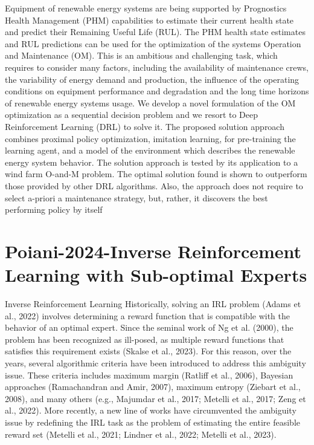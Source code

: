 \documentclass{article}
\begin{document}
Equipment of renewable energy systems are being supported by Prognostics  Health Management (PHM) capabilities to estimate their current health state and predict their Remaining Useful Life (RUL). The PHM health state estimates and RUL predictions can be used for the optimization of the systems Operation and Maintenance (OM). This is an ambitious and challenging task, which requires to consider many factors, including the availability of maintenance crews, the variability of energy demand and production, the influence of the operating conditions on equipment performance and degradation and the long time horizons of renewable energy systems usage. We develop a novel formulation of the OM optimization as a sequential decision problem and we resort to Deep Reinforcement Learning (DRL) to solve it. The proposed solution approach combines proximal policy optimization, imitation learning, for pre-training the learning agent, and a model of the environment which describes the renewable energy system behavior. The solution approach is tested by its application to a wind farm O-and-M problem. The optimal solution found is shown to outperform those provided by other DRL algorithms. Also, the approach does not require to select a-priori a maintenance strategy, but, rather, it discovers the best performing policy by itself



\section{Poiani-2024-Inverse Reinforcement Learning with Sub-optimal Experts}

Inverse Reinforcement Learning Historically,
solving an IRL problem (Adams et al., 2022) involves
determining a reward function that is compatible with
the behavior of an optimal expert. Since the seminal
work of Ng et al. (2000), the problem has been recognized
as ill-posed, as multiple reward functions that
satisfies this requirement exists (Skalse et al., 2023).
For this reason, over the years, several algorithmic
criteria have been introduced to address this ambiguity
issue. These criteria includes maximum margin
(Ratliff et al., 2006), Bayesian approaches (Ramachandran
and Amir, 2007), maximum entropy (Ziebart
et al., 2008), and many others (e.g., Majumdar et al.,
2017; Metelli et al., 2017; Zeng et al., 2022). More
recently, a new line of works have circumvented the
ambiguity issue by redefining the IRL task as the problem
of estimating the entire feasible reward set (Metelli
et al., 2021; Lindner et al., 2022; Metelli et al., 2023).
\end{document}
